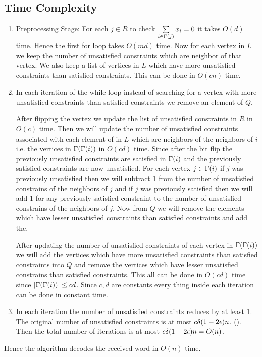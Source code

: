\documentclass[a4paper, 11pt]{article}
\begin{document}
{\begin{enumerate}
\section{Time Complexity}
\begin{enumerate}
	\item Preprocessing Stage: For each $j\in R$ to check $\sum\limits_{i\in \Gamma(j)}x_i=0$ it takes $O(d)$ time. Hence the first for loop takes $O(md)$ time. Now for each vertex in $L$ we keep the number of unsatisfied constraints which are neighbor of that vertex. We also keep a list of vertices in $L$ which have more unsatisfied constraints than satisfied constraints. This can be done in $O(cn)$ time.
	\item In each iteration of the while loop instead of searching for a vertex with more unsatisfied constraints than satisfied constraints we remove an element of $Q$. \parinn
	
	After flipping the vertex we update the list of unsatisfied constraints in $R$ in $O(c)$ time. Then we  will update the number of unsatisfied constraints associated with each element of in $L$ which are neighbors of the neighbors of $i$ i.e. the vertices in  $\Gamma(\Gamma(i))$ in $O(cd)$ time. Since after the bit flip the previously unsatisfied constraints are satisfied in $\Gamma(i)$ and the previously satisfied constraints are now unsatisfied. For each vertex $j\in\Gamma(i)$ if $j$ was previously unsatisfied then we will subtract 1 from the number of unsatisfied constrains of the neighbors of $j$ and if $j$ was previously satisfied then we will add 1 for any previously satisfied constraint to the number of unsatisfied constrains of the neighbors of $j$. Now from $Q$ we will remove the elements which have lesser unsatisfied constraints than satisfied constraints and add the.
	
	After updating the number of unsatisfied constraints of each vertex in $\Gamma(\Gamma(i))$ we will add the vertices which have more unsatisfied constraints than satisfied constraints into $Q$ and remove the vertices which have lesser unsatisfied constrains than satisfied constraints. This all can be done in $O(cd)$ time since $|\Gamma(\Gamma(i))|\leq cd$. Since $c,d$ are constants every thing inside each iteration can be done in constant time.
	\item In each iteration the number of unsatisfied constraints reduces by at least 1. The original number of unsatisfied constraints is at most $c\delta (1-2\epsilon)n$. (). Then the total number of iterations is at most $c\delta(1-2\epsilon)n=O(n)$.
\end{enumerate}
Hence the algorithm decodes the received word in $O(n)$ time.
\end{enumerate}
}
\end{document}
